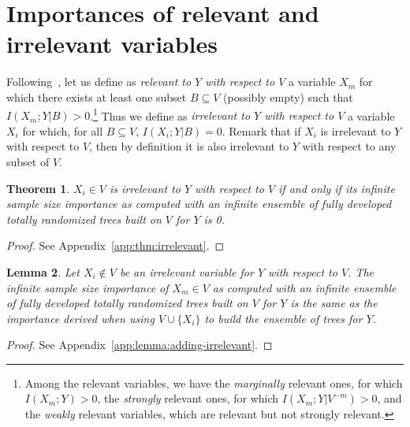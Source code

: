 \documentclass{article}
\newtheorem{theorem}{Theorem}
\newtheorem{lemma}[theorem]{Lemma}
\begin{document}

\section{Importances of relevant and irrelevant variables}
\label{sec:rel}

Following~\citet{kohavi1997wrappers}, let us define as {\em relevant to $Y$ with
respect to $V$} a variable $X_m$ for which there exists at least one subset $B
\subseteq V$ (possibly empty) such that $I(X_m;Y|B)>0$.\footnote{Among the
relevant variables, we have the {\em marginally} relevant
ones, for which $I(X_{m}; Y) > 0$, the  {\em strongly} relevant ones, for
which $I(X_{m}; Y | V^{-m}) > 0$,  and the {\em weakly} relevant variables, which are
relevant but not strongly relevant. } Thus we define as {\em irrelevant to $Y$ with respect to $V$} a variable
$X_i$ for which, for all $B \subseteq V$, $I(X_i; Y|B)=0$. Remark that if
$X_i$ is irrelevant to $Y$ with respect to $V$, then by definition it is also
irrelevant to $Y$ with respect to any subset of $V$. %

\begin{theorem}\label{thm:irrelevant}
  $X_i \in V$ is irrelevant to $Y$ with respect to $V$ if and only if  its
  infinite sample size importance as computed with an infinite ensemble of fully
  developed totally randomized trees built on $V$ for $Y$ is 0.
\end{theorem}

\begin{proof}
See Appendix~\ref{app:thm:irrelevant}.
\end{proof}

\begin{lemma}\label{lemma:adding-irrelevant}
  Let $X_i \notin V$ be an irrelevant variable for $Y$ with respect to $V$. The infinite
  sample size importance of $X_m \in V$ as computed with an infinite
  ensemble of fully developed totally randomized trees built on $V$ for $Y$ is the
  same as the importance derived when using $V\cup \{X_i\}$ to build the ensemble of trees for $Y$.
\end{lemma}

\begin{proof}
See Appendix~\ref{app:lemma:adding-irrelevant}.
\end{proof}
\end{document}
